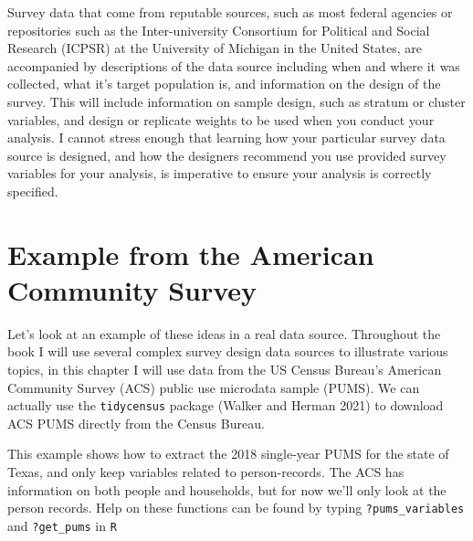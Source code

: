 \documentclass[
  letterpaper,
  DIV=11,
  numbers=noendperiod]{scrreprt}
\begin{document}
Survey data that come from reputable sources, such as most federal
agencies or repositories such as the Inter-university Consortium for
Political and Social Research (ICPSR) at the University of Michigan in
the United States, are accompanied by descriptions of the data source
including when and where it was collected, what it's target population
is, and information on the design of the survey. This will include
information on sample design, such as stratum or cluster variables, and
design or replicate weights to be used when you conduct your analysis. I
cannot stress enough that learning how your particular survey data
source is designed, and how the designers recommend you use provided
survey variables for your analysis, is imperative to ensure your
analysis is correctly specified.

\hypertarget{example-from-the-american-community-survey}{%
\section{Example from the American Community
Survey}\label{example-from-the-american-community-survey}}

Let's look at an example of these ideas in a real data source.
Throughout the book I will use several complex survey design data
sources to illustrate various topics, in this chapter I will use data
from the US Census Bureau's American Community Survey (ACS) public use
microdata sample (PUMS). We can actually use the \texttt{tidycensus}
package (Walker and Herman 2021) to download ACS PUMS directly from the
Census Bureau.

This example shows how to extract the 2018 single-year PUMS for the
state of Texas, and only keep variables related to person-records. The
ACS has information on both people and households, but for now we'll
only look at the person records. Help on these functions can be found by
typing \texttt{?pums\_variables} and \texttt{?get\_pums} in \texttt{R}
\end{document}
